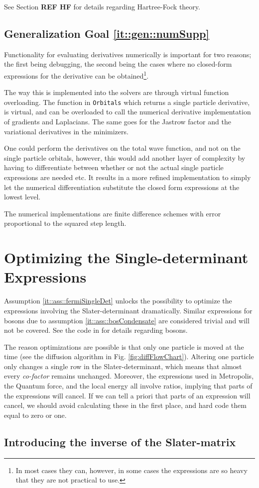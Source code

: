 See Section \textbf{REF HF} for details regarding Hartree-Fock theory.

\subsection{Generalization Goal \ref{it::gen::numSupp}}

Functionality for evaluating derivatives numerically is important for two reasons; the first being debugging, the second being the cases where no closed-form expressions for the derivative can be obtained\footnote{In most cases they can, however, in some cases the expressions are so heavy that they are not practical to use.}.

The way this is implemented into the solvers are through virtual function overloading. The function in \verb+Orbitals+ which returns a single particle derivative, is virtual, and can be overloaded to call the numerical derivative implementation of gradients and Laplacians. The same goes for the Jastrow factor and the variational derivatives in the minimizers.

One could perform the derivatives on the total wave function, and not on the single particle orbitals, however, this would add another layer of complexity by having to differentiate between whether or not the actual single particle expressions are needed etc. It results in a more refined implementation to simply let the numerical differentiation substitute the closed form expressions at the lowest level.

The numerical implementations are finite difference schemes with error proportional to the squared step length.

\section{Optimizing the Single-determinant Expressions}

Assumption \ref{it::ass::fermiSingleDet} unlocks the possibility to optimize the expressions involving the Slater-determinant dramatically. Similar expressions for bosons due to assumption \ref{it::ass::bosCondensate} are considered trivial and will not be covered. See the code in \cite{libBorealisCode} for details regarding bosons.

The reason optimizations are possible is that only one particle is moved at the time (see the diffusion algorithm in Fig. \ref{fig:diffFlowChart}). Altering one particle only changes a single row in the Slater-determinant, which means that almost every \textit{co-factor} remains unchanged. Moreover, the expressions used in Metropolis, the Quantum force, and the local energy all involve ratios, implying that parts of the expressions will cancel. If we can tell a priori that parts of an expression will cancel, we should avoid calculating these in the first place, and hard code them equal to zero or one.

\subsection{Introducing the inverse of the Slater-matrix}


